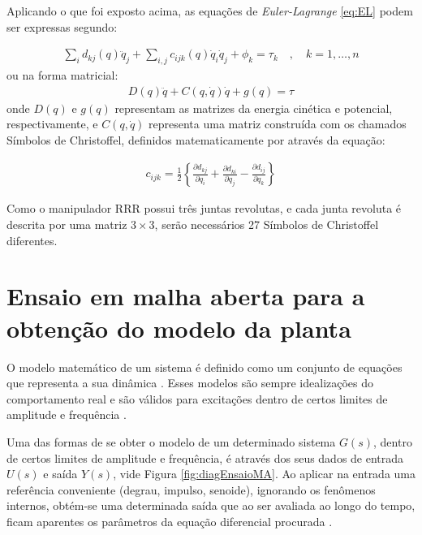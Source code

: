 Aplicando o que foi exposto acima, as equações de \textit{Euler-Lagrange} 
\eqref{eq:EL} podem ser expressas segundo:

\begin{equation}
  \begin{gathered}
    \sum_i d_{kj}(q)\ddot q_j + \sum_{i,j}c_{ijk}(q)\dot q_i\dot q_j + \phi_k = \tau_k \quad, \quad k=1,\dots,n
  \end{gathered}
  \label{eq:EL_Final}
\end{equation}
ou na forma matricial:
\begin{equation}
  \begin{gathered}
    D(q)\ddot q + C(q,\dot q)\dot q + g(q) = \tau
  \end{gathered}
  \label{eq:EL_FinalMat}
\end{equation}
onde $D(q)$ e $g(q)$ representam as matrizes da energia cinética e potencial, 
respectivamente, e $C(q,\dot q)$ representa uma matriz construída com os chamados
Símbolos de Christoffel, definidos matematicamente por  através
da equação:

\begin{equation}
  \begin{gathered}
    c_{ijk} = \frac{1}{2} \left\{ \frac{\partial d_{kj}}{\partial q_i}+\frac{\partial d_{ki}}{\partial q_j}-\frac{\partial d_{ij}}{\partial q_k} \right\}
  \end{gathered}
  \label{eq:christoffel}
\end{equation}

Como o manipulador RRR possui três juntas revolutas, e cada junta revoluta é descrita por uma matriz 
$3 \times 3$, serão necessários 27 Símbolos de Christoffel diferentes.

\section{Ensaio em malha aberta para a obtenção do modelo da planta}

O modelo matemático de um sistema é definido como um conjunto de equações que representa a sua dinâmica \cite{Ogata}. 
Esses modelos são sempre idealizações do comportamento
real e são válidos para excitações dentro de certos limites de amplitude e frequência \cite{Castrucci}.

Uma das formas de se obter o modelo de um determinado sistema $G(s)$, dentro de certos limites de amplitude e frequência,
é através dos seus dados de entrada $U(s)$ e saída $Y(s)$, vide Figura \ref{fig:diagEnsaioMA}. Ao aplicar na entrada uma 
referência conveniente (degrau, impulso, senoide), ignorando os fenômenos internos, obtém-se uma determinada saída que ao 
ser avaliada ao longo do tempo, ficam aparentes os parâmetros da equação diferencial procurada \cite{Castrucci}.

